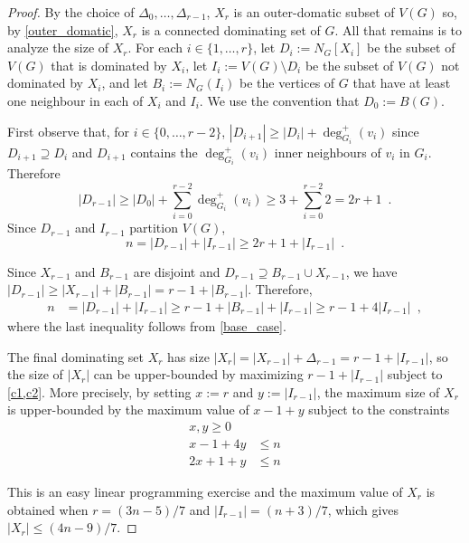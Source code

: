 \documentclass[11pt]{article}
\theoremstyle{definition}
\begin{document}
\begin{proof}
By the choice of $\Delta_0,\ldots,\Delta_{r-1}$, $X_r$ is an outer-domatic subset of $V(G)$ so, by \cref{outer_domatic}, $X_r$ is a connected dominating set of $G$.  All that remains is to analyze the size of $X_r$.  For each $i\in\{1,\ldots,r\}$, let $D_i:=N_G[X_i]$ be the subset of $V(G)$ that is dominated by $X_i$, let $I_i:=V(G)\setminus D_i$ be the subset of $V(G)$ not dominated by $X_i$, and let $B_i:=N_G(I_i)$ be the vertices of $G$ that have at least one neighbour in each of $X_i$ and $I_i$.  We use the convention that $D_0:=B(G)$.

First observe that, for $i\in\{0,\ldots,r-2\}$, $|D_{i+1}|\ge |D_i|+\deg_{G_i}^+(v_i)$ since $D_{i+1}\supseteq D_i$ and $D_{i+1}$ contains the $\deg_{G_i}^+(v_i)$ inner neighbours of $v_i$ in $G_i$.  Therefore
\[
    |D_{r-1}| \ge |D_0| + \sum_{i=0}^{r-2} \deg_{G_i}^+(v_i) \ge 3 + \sum_{i=0}^{r-2} 2 =  2r+1 \enspace . \label{double_d}
\]
Since $D_{r-1}$ and $I_{r-1}$ partition $V(G)$,
\begin{equation}
  n = |D_{r-1}| + |I_{r-1}| \ge 2r+1 + |I_{r-1}|  \enspace . \label{c1}
\end{equation}

Since $X_{r-1}$ and $B_{r-1}$ are disjoint and $D_{r-1}\supseteq B_{r-1}\cup X_{r-1}$, we have $|D_{r-1}|\ge |X_{r-1}| + |B_{r-1}|=r-1+|B_{r-1}|$.  Therefore,
\begin{align}
    n & = |D_{r-1}| + |I_{r-1}| \ge r-1 + |B_{r-1}| + |I_{r-1}| \ge r - 1 + 4|I_{r-1}| \enspace , \label{c2}
\end{align}
where the last inequality follows from \cref{base_case}.

The final dominating set $X_r$ has size $|X_r| = |X_{r-1}| + \Delta_{r-1} = r - 1 +|I_{r-1}|$, so the size of $|X_r|$ can be upper-bounded by maximizing $r-1+|I_{r-1}|$ subject to \cref{c1,c2}.  More precisely, by setting $x:=r$ and $y:=|I_{r-1}|$, the maximum size of $X_r$ is upper-bounded by the maximum value of $x-1+y$ subject to the constraints
\begin{align*}
x,y \ge 0 \\
  x - 1 + 4y & \le n \\
  2x + 1 + y & \le n
\end{align*}

This is an easy linear programming exercise and the maximum value of $X_{r}$ is obtained when $r=(3n-5)/7$ and $|I_{r-1}|=(n+3)/7$, which gives
$|X_r| \le (4n-9)/7$.
\end{proof}
\end{document}
